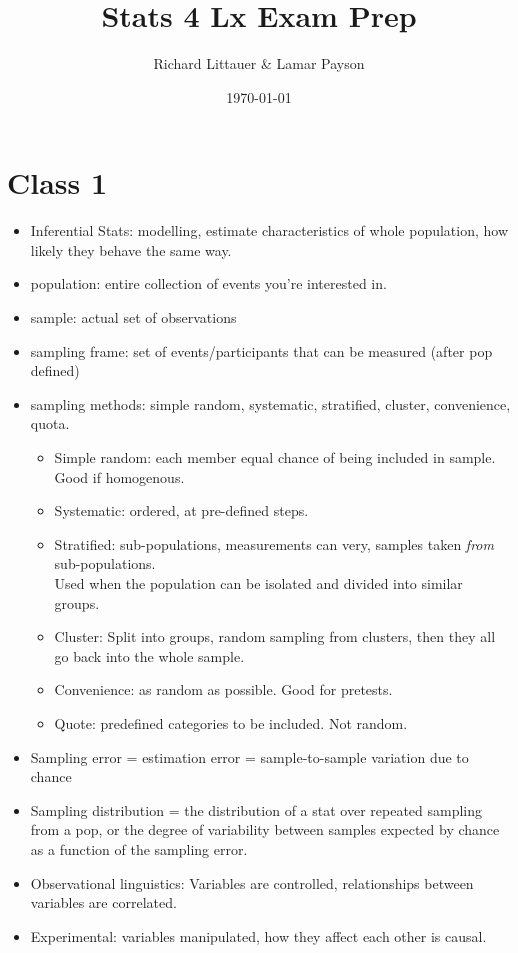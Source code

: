 \documentclass[11pt]{article}
\title{Stats 4 Lx Exam Prep}
\author{Richard Littauer \& Lamar Payson}
\date{\today}                          		%
\newenvironment{itemise}{
\begin{itemize}
  \setlength{\itemsep}{1pt}
  \setlength{\parskip}{0pt}
  \setlength{\parsep}{0pt}
}{\end{itemize}}
\begin{document}
\maketitle

\section*{Class 1}
\begin{itemise}
\item Inferential Stats: modelling, estimate characteristics of whole population, how likely they behave the same way.
\item population: entire collection of events you're interested in. 
\item sample: actual set of observations
\item sampling frame: set of events/participants that can be measured (after pop defined)
\item sampling methods: simple random, systematic, stratified, cluster, convenience, quota.
\begin{itemise}
\item Simple random: each member equal chance of being included in sample. Good if homogenous.
\item Systematic: ordered, at pre-defined steps.
\item Stratified: sub-populations, measurements can very, samples taken {\it from} sub-populations. \\
Used when the population can be isolated and divided into similar groups.
\item Cluster: Split into groups, random sampling from clusters, then they all go back into the whole sample.
\item Convenience: as random as possible. Good for pretests.
\item Quote: predefined categories to be included. Not random. 
\end{itemise}
\item Sampling error = estimation error = sample-to-sample variation due to chance
\item Sampling distribution = the distribution of a stat over repeated sampling from a pop, or the degree of variability between samples expected by chance as a function of the sampling error.
\item Observational linguistics: Variables are controlled, relationships between variables are correlated.
\item Experimental: variables manipulated, how they affect each other is causal. 
\end{itemise}
\end{document}
